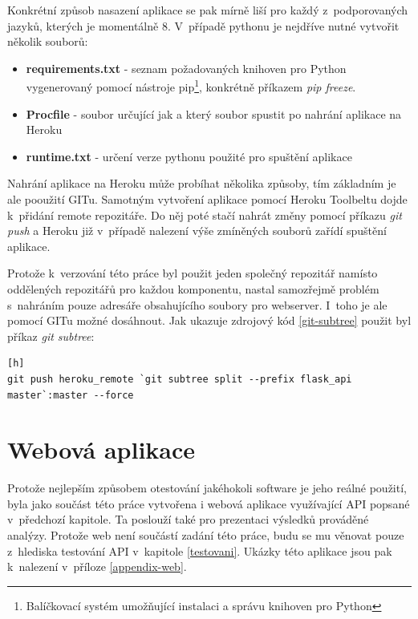 \documentclass[thesis=B,czech]{FITthesis}[2012/06/26]
\begin{document}
Konkrétní způsob nasazení aplikace se pak mírně liší pro každý z~podporovaných jazyků, kterých je momentálně 8. V~případě pythonu je nejdříve nutné vytvořit několik souborů:

\begin{itemize}
\item \textbf{requirements.txt} - seznam požadovaných knihoven pro Python vygenerovaný pomocí nástroje pip\footnote{Balíčkovací systém umožňující instalaci a správu knihoven pro Python}, konkrétně příkazem \textit{pip freeze}.
\item \textbf{Procfile} - soubor určující jak a který soubor spustit po nahrání aplikace na Heroku
\item \textbf{runtime.txt} - určení verze pythonu použité pro spuštění aplikace
\end{itemize}

Nahrání aplikace na Heroku může probíhat několika způsoby, tím základním je ale pooužití GITu. Samotným vytvoření aplikace pomocí Heroku Toolbeltu dojde k~přidání remote repozitáře. Do něj poté stačí nahrát změny pomocí příkazu \textit{git push} a Heroku již v~případě nalezení výše zmíněných souborů zařídí spuštění aplikace. 

Protože k~verzování této práce byl použit jeden společný repozitář namísto oddělených repozitářů pro každou komponentu, nastal samozřejmě problém s~nahráním pouze adresáře obsahujícího soubory pro webserver. I~toho je ale pomocí GITu možné dosáhnout. Jak ukazuje zdrojový kód \ref{git-subtree} použit byl příkaz \textit{git subtree}:


\begin{lstlisting}[caption={Příkaz pro nahrání podadresáře na Heroku},label=git-subtree][h]
git push heroku_remote `git subtree split --prefix flask_api master`:master --force
\end{lstlisting}



\section{Webová aplikace}
	Protože nejlepším způsobem otestování jakéhokoli software je jeho reálné použití, byla jako součást této práce vytvořena i webová aplikace využívající API popsané v~předchozí kapitole. Ta poslouží také pro prezentaci výsledků prováděné analýzy. Protože web není součástí zadání této práce, budu se mu věnovat pouze z~hlediska testování API v~kapitole \ref{testovani}. Ukázky této aplikace jsou pak k~nalezení v~příloze \ref{appendix-web}.  
	
\end{document}
